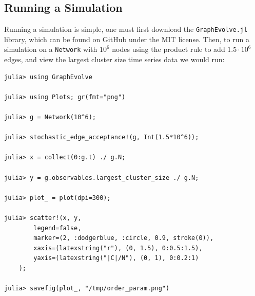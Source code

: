 \subsection{Running a Simulation}
Running a simulation is simple, one must first download the \texttt{GraphEvolve.jl} library, which can be found on GitHub under the MIT license.
Then, to run a simulation on a \texttt{Network} with $10^6$ nodes using the product rule to add $1.5 \cdot 10^6$ edges, and view the largest cluster size time series data we would run:

\begin{lstlisting}
julia> using GraphEvolve

julia> using Plots; gr(fmt="png")

julia> g = Network(10^6);

julia> stochastic_edge_acceptance!(g, Int(1.5*10^6));

julia> x = collect(0:g.t) ./ g.N;

julia> y = g.observables.largest_cluster_size ./ g.N;

julia> plot_ = plot(dpi=300);

julia> scatter!(x, y,
		legend=false,
		marker=(2, :dodgerblue, :circle, 0.9, stroke(0)),
		xaxis=(latexstring("r"), (0, 1.5), 0:0.5:1.5),
		yaxis=(latexstring("|C|/N"), (0, 1), 0:0.2:1)
	);

julia> savefig(plot_, "/tmp/order_param.png")
\end{lstlisting}
